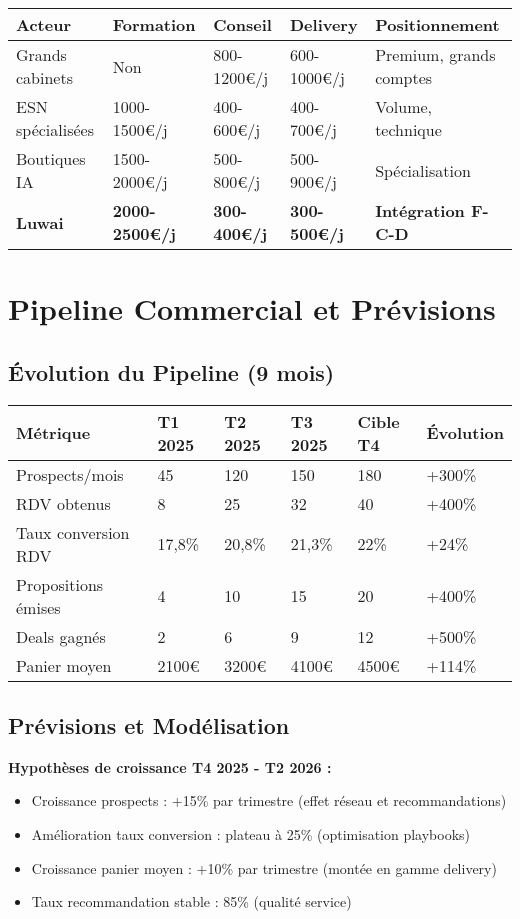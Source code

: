 \begin{longtable}{@{}p{4cm}p{3cm}p{3cm}p{3cm}p{3cm}@{}}
\toprule
\textbf{Acteur} & \textbf{Formation} & \textbf{Conseil} & \textbf{Delivery} & \textbf{Positionnement} \\
\midrule
Grands cabinets & Non & 800-1200€/j & 600-1000€/j & Premium, grands comptes \\
ESN spécialisées & 1000-1500€/j & 400-600€/j & 400-700€/j & Volume, technique \\
Boutiques IA & 1500-2000€/j & 500-800€/j & 500-900€/j & Spécialisation \\
\textbf{Luwai} & \textbf{2000-2500€/j} & \textbf{300-400€/j} & \textbf{300-500€/j} & \textbf{Intégration F-C-D} \\
\bottomrule
\end{longtable}

\section{Pipeline Commercial et Prévisions}

\subsection{Évolution du Pipeline (9 mois)}

\begin{longtable}{@{}p{3cm}p{2cm}p{2cm}p{2cm}p{2cm}p{2cm}@{}}
\toprule
\textbf{Métrique} & \textbf{T1 2025} & \textbf{T2 2025} & \textbf{T3 2025} & \textbf{Cible T4} & \textbf{Évolution} \\
\midrule
Prospects/mois & 45 & 120 & 150 & 180 & +300\% \\
RDV obtenus & 8 & 25 & 32 & 40 & +400\% \\
Taux conversion RDV & 17,8\% & 20,8\% & 21,3\% & 22\% & +24\% \\
Propositions émises & 4 & 10 & 15 & 20 & +400\% \\
Deals gagnés & 2 & 6 & 9 & 12 & +500\% \\
Panier moyen & 2100€ & 3200€ & 4100€ & 4500€ & +114\% \\
\bottomrule
\end{longtable}

\subsection{Prévisions et Modélisation}

\textbf{Hypothèses de croissance T4 2025 - T2 2026 :}
\begin{itemize}
    \item Croissance prospects : +15\% par trimestre (effet réseau et recommandations)
    \item Amélioration taux conversion : plateau à 25\% (optimisation playbooks)
    \item Croissance panier moyen : +10\% par trimestre (montée en gamme delivery)
    \item Taux recommandation stable : 85\% (qualité service)
\end{itemize}

